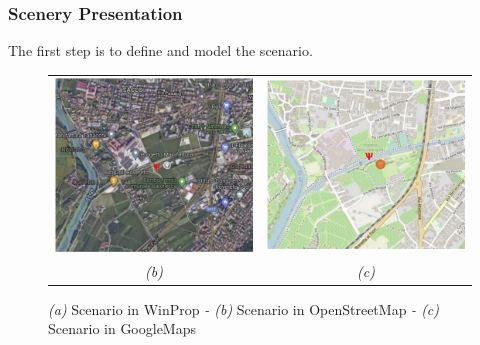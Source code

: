\subsubsection{Scenery Presentation}
The first step is to define and model the scenario.

\begin{figure}[H]
\begin{center}\begin{tabular}{cc}
\includegraphics[scale=0.075]{./Figure/Planning.EM/Fig.Scenario.Rovereto.OSM.jpg}&
\includegraphics[scale=0.075]{./Figure/Planning.EM/Fig.Scenario.Rovereto.GM.jpg}\tabularnewline
\emph{(b)}&\emph{(c)}\tabularnewline
\end{tabular}\end{center}

\vspace{-10pt}
\caption{\footnotesize \emph{(a)} Scenario in WinProp \emph{- (b)} Scenario in OpenStreetMap
\emph{- (c)} Scenario in GoogleMaps}
\end{figure}
\vspace{-10pt}
